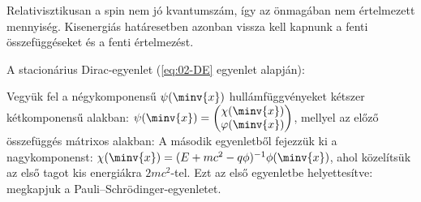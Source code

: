    Relativisztikusan a spin nem jó kvantumszám, így az önmagában nem értelmezett mennyiség.
   Kisenergiás határesetben azonban vissza kell kapnunk a fenti összefüggéseket és a fenti értelmezést. 
   
   A stacionárius Dirac-egyenlet (\eqref{eq:02-DE} egyenlet alapján):
   
   Vegyük fel a négykomponensű $\psi(\minv{x})$ hullámfüggvényeket kétszer kétkomponensű alakban: 
   $\psi(\minv{x})=\begin{pmatrix}
                    \chi(\minv{x})\\
                    \varphi(\minv{x})
                   \end{pmatrix}$,
   mellyel az előző összefüggés mátrixos alakban:
   A második egyenletből fejezzük ki a nagykomponenst: $\chi(\minv{x})=(E+mc^2-q\phi)^{-1}\phi(\minv{x})$, ahol közelítsük az első tagot kis energiákra $2mc^2$-tel.
   Ezt az első egyenletbe helyettesítve:
   megkapjuk a Pauli--Schrödinger-egyenletet. 

